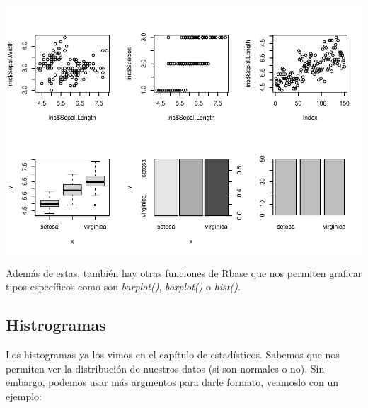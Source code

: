 \documentclass[
]{book}
\newenvironment{Shaded}{\begin{snugshade}}{\end{snugshade}}
\newcommand{\AttributeTok}[1]{\textcolor[rgb]{0.13,0.29,0.53}{#1}}
\newcommand{\FunctionTok}[1]{\textcolor[rgb]{0.13,0.29,0.53}{\textbf{#1}}}
\newcommand{\NormalTok}[1]{#1}
\newcommand{\SpecialCharTok}[1]{\textcolor[rgb]{0.81,0.36,0.00}{\textbf{#1}}}
\newcommand{\StringTok}[1]{\textcolor[rgb]{0.31,0.60,0.02}{#1}}
\begin{document}
\hfill\break

\begin{center}\includegraphics{R_Manual_files/figure-latex/unnamed-chunk-190-1} \end{center}

\hfill\break

Además de estas, también hay otras funciones de Rbase que nos permiten graficar tipos específicos como son \emph{barplot()}, \emph{boxplot()} o \emph{hist()}.

\hfill\break

\subsection{Histrogramas}\label{histrogramas}

Los histogramas ya los vimos en el capítulo de estadísticos.
Sabemos que nos permiten ver la distribución de nuestros datos (si son normales o no).
Sin embargo, podemos usar más argmentos para darle formato, veamoslo con un ejemplo:

\begin{Shaded}
\end{Shaded}
\end{document}
